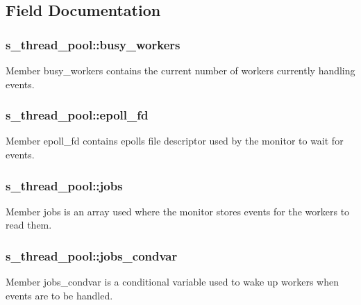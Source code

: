 \subsection{Field Documentation}
\hypertarget{structs__thread__pool_a93fd6e2cb28298435a38d19df6b8ceb0}{}
\subsubsection[{busy\+\_\+workers}]{\setlength{\rightskip}{0pt plus 5cm}s\+\_\+thread\+\_\+pool\+::busy\+\_\+workers}\label{structs__thread__pool_a93fd6e2cb28298435a38d19df6b8ceb0}
Member \textquotesingle{}busy\+\_\+workers\textquotesingle{} contains the current number of workers currently handling events. \hypertarget{structs__thread__pool_ad29f26123236fdfa8e758cd4dd75ff0b}{}
\subsubsection[{epoll\+\_\+fd}]{\setlength{\rightskip}{0pt plus 5cm}s\+\_\+thread\+\_\+pool\+::epoll\+\_\+fd}\label{structs__thread__pool_ad29f26123236fdfa8e758cd4dd75ff0b}
Member \textquotesingle{}epoll\+\_\+fd\textquotesingle{} contains epoll\textquotesingle{}s file descriptor used by the monitor to wait for events. \hypertarget{structs__thread__pool_a88d77ee858e9c9d6b43bdcb35c86b73b}{}
\subsubsection[{jobs}]{\setlength{\rightskip}{0pt plus 5cm}s\+\_\+thread\+\_\+pool\+::jobs}\label{structs__thread__pool_a88d77ee858e9c9d6b43bdcb35c86b73b}
Member \textquotesingle{}jobs\textquotesingle{} is an array used where the monitor stores events for the workers to read them. \hypertarget{structs__thread__pool_aef0ffc31f56dff666865314b3b7f14df}{}
\subsubsection[{jobs\+\_\+condvar}]{\setlength{\rightskip}{0pt plus 5cm}s\+\_\+thread\+\_\+pool\+::jobs\+\_\+condvar}\label{structs__thread__pool_aef0ffc31f56dff666865314b3b7f14df}
Member \textquotesingle{}jobs\+\_\+condvar\textquotesingle{} is a conditional variable used to wake up workers when events are to be handled. \hypertarget{structs__thread__pool_a28c1be718ce196b7a79bbe7c815e90fe}{}
